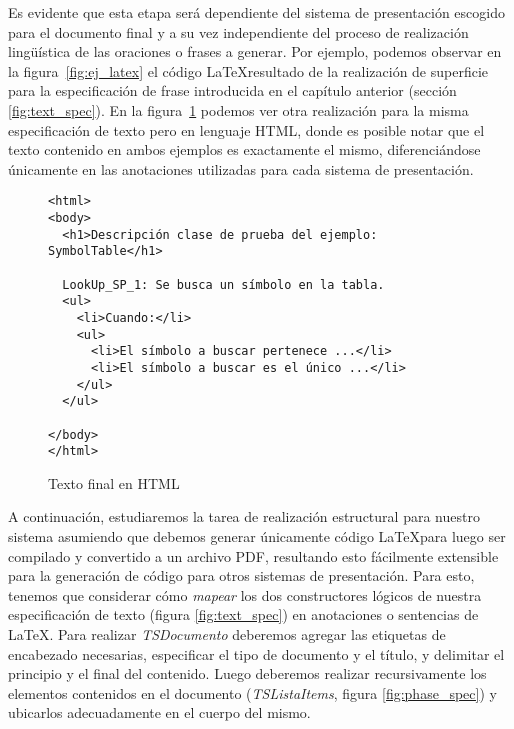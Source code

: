 Es evidente que esta etapa será dependiente del sistema de presentación escogido para el documento final y a su vez independiente del proceso de realización lingüística de las oraciones o frases a generar.  Por ejemplo, podemos observar en la figura~\ref{fig:ej_latex} el código \LaTeX resultado de la realización de superficie para la especificación de frase introducida en el capítulo anterior (sección \ref{fig:text_spec}). En la figura~\ref{fig:ej_html} podemos ver otra realización para la misma especificación de texto pero en lenguaje HTML, donde es posible notar que el texto contenido en ambos ejemplos es exactamente el mismo, diferenciándose únicamente en las anotaciones utilizadas para cada sistema de presentación.

\begin{figure}[H]
  \begin{verbatim}
<html>
<body>
  <h1>Descripción clase de prueba del ejemplo: SymbolTable</h1>

  LookUp_SP_1: Se busca un símbolo en la tabla.  
  <ul>
    <li>Cuando:</li>
    <ul>
      <li>El símbolo a buscar pertenece ...</li>
      <li>El símbolo a buscar es el único ...</li>
    </ul>
  </ul>

</body>
</html>
  \end{verbatim}
  \caption{Texto final en HTML}
  \label{fig:ej_html}
\end{figure}


A continuación, estudiaremos la tarea de realización estructural para nuestro sistema asumiendo que debemos generar únicamente código \LaTeX para luego ser compilado y convertido a un archivo PDF, resultando esto fácilmente extensible para la generación de código para otros sistemas de presentación. Para esto, tenemos que considerar cómo \emph{mapear} los dos constructores lógicos de nuestra especificación de texto (figura \ref{fig:text_spec}) en anotaciones o sentencias de \LaTeX. Para realizar \emph{TSDocumento} deberemos agregar las etiquetas de encabezado necesarias, especificar el tipo de documento y el título, y delimitar el principio y el final del contenido. Luego deberemos realizar recursivamente los elementos contenidos en el documento (\emph{TSListaItems}, figura \ref{fig:phase_spec}) y ubicarlos adecuadamente en el cuerpo del mismo.

